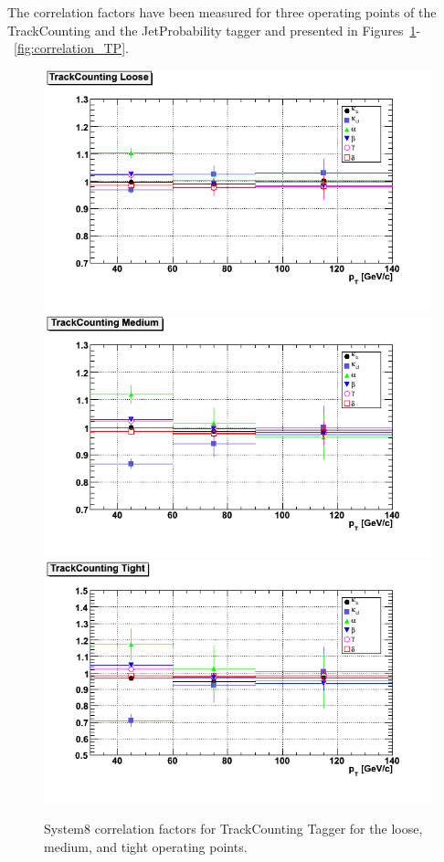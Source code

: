 The correlation factors have been measured for three operating points of the 
TrackCounting and the JetProbability tagger and presented in 
Figures~\ref{fig:correlation_TC}-~\ref{fig:correlation_TP}.


\begin{figure}[htbp]
  \begin{center}
    \includegraphics[width=120mm]{Figures/TCL_correlations_ppmux.png}
    \includegraphics[width=120mm]{Figures/TCM_correlations_ppmux.png}
    \includegraphics[width=120mm]{Figures/TCT_correlations_ppmux.png}
  \end{center}
  \caption{System8 correlation factors for TrackCounting Tagger for the loose, medium, and tight operating points.}
  \label{fig:correlation_TC}
\end{figure}

